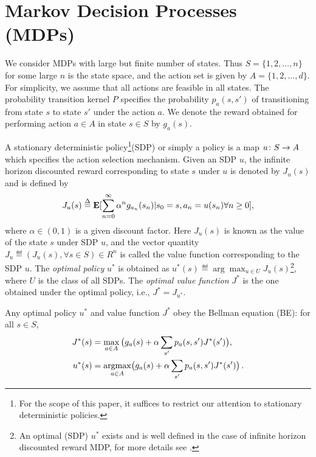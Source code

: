\section{Markov Decision Processes (MDPs)}
We consider MDPs with large but finite number of states. Thus $S=\{1,2,\ldots,n\}$ for some large $n$ is the state space, and the action set is given by $A=\{1,2,\ldots,d\}$. For simplicity, we assume that all actions are feasible in all states. The probability transition kernel $P$ specifies the probability $p_a(s,s')$ of transitioning from state $s$ to state $s'$ under the action $a$. We denote the reward obtained for performing action $a\in A$ in state $s\in S$ by $g_a(s)$.\par
A stationary deterministic policy\footnote{For the scope of this paper, it suffices to restrict our attention to stationary deterministic policies.}(SDP) or simply a policy is a map $u\colon S\rightarrow A$ which specifies the action selection mechanism. Given an SDP $u$, the infinite horizon discounted reward corresponding to state $s$ under $u$ is denoted by $J_u(s)$ and is defined by
\begin{align}
J_u(s)\stackrel{\Delta}{=}\mathbf{E}[\sum_{n=0}^\infty \alpha^n g_{a_n}(s_n)|s_0=s,a_n=u(s_n)\relax{ }\forall n\geq 0],\nonumber
\end{align}
where $\alpha \in (0,1)$ is a given discount factor. Here $J_u(s)$ is known as the value of the state $s$ under SDP $u$, and the vector quantity $J_u\eqdef(J_u(s), \forall s\in S)\in R^n$ is called the value function corresponding to the SDP $u$. The \emph{optimal policy} $u^*$ is obtained as $u^*(s)\eqdef\arg\max_{u\in U}J_u(s)$\footnote{An optimal (SDP) $u^*$ exists and is well defined in the case of infinite horizon discounted reward MDP, for more details see \cite{BertB}.}, where $U$ is the class of all SDPs. The \emph{optimal value function} $J^*$ is the one obtained under the optimal policy, i.e., $J^*=J_{u^*}$.\par
Any optimal policy $u^*$ and value function $J^*$ obey the Bellman equation (BE): for all $ s \in S$, 
\begin{subequations}\label{bell}
\begin{align}
\label{bellval}J^*(s)&=\max_{ a\in A}\big(g_a(s)+\alpha \sum_{s'}p_a(s,s')J^*(s')\big),\\
\label{bellpol}u^*(s)&= \underset{a\in A}{\argmax}\big(g_a(s)+\alpha \sum_{s'}p_a(s,s')J^*(s')\big)\,.
\end{align}
\end{subequations}
